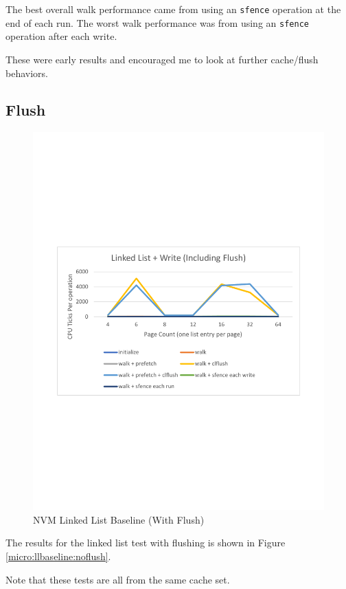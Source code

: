 The best overall walk performance came from using an 
\texttt{sfence} operation at the end of each run.  The worst
walk performance was from using an \texttt{sfence} operation
after each write.

These were early results and encouraged me to look at further
cache/flush behaviors.

\subsection{Flush}

\begin{figure}
    \centering
    \caption{NVM Linked List Baseline (With Flush)}\label{micro:llbaseline:flush}
    \includegraphics[scale=0.35]{micro/nvm-linked-list-baseline-with-flush.pdf}
\end{figure}

The results for the linked list test with flushing is
shown in Figure \ref{micro:llbaseline:noflush}.

Note that these tests are all from the same cache set.

